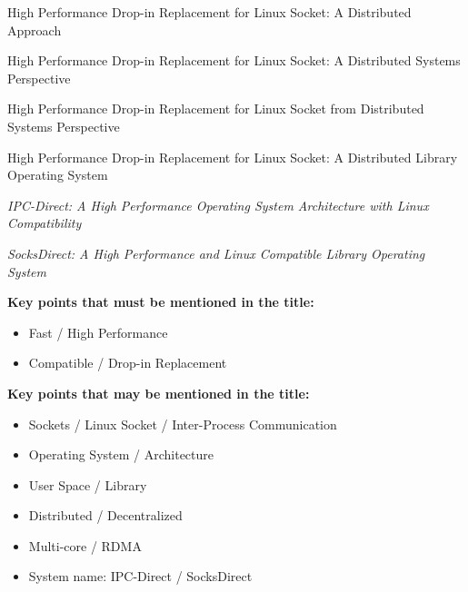 High Performance Drop-in Replacement for Linux Socket: A Distributed Approach

High Performance Drop-in Replacement for Linux Socket: A Distributed Systems Perspective

High Performance Drop-in Replacement for Linux Socket from Distributed Systems Perspective

High Performance Drop-in Replacement for Linux Socket: A Distributed Library Operating System

\textit{IPC-Direct: A High Performance Operating System Architecture with Linux Compatibility}

\textit{SocksDirect: A High Performance and Linux Compatible Library Operating System}

\textbf{Key points that must be mentioned in the title:}

\begin{itemize}
	\item Fast / High Performance
	\item Compatible / Drop-in Replacement
\end{itemize}

\textbf{Key points that may be mentioned in the title:}

\begin{itemize}
	\item Sockets / Linux Socket / Inter-Process Communication
	\item Operating System / Architecture
	\item User Space / Library
	\item Distributed / Decentralized
	\item Multi-core / RDMA
	\item System name: IPC-Direct / SocksDirect
\end{itemize}
\fi